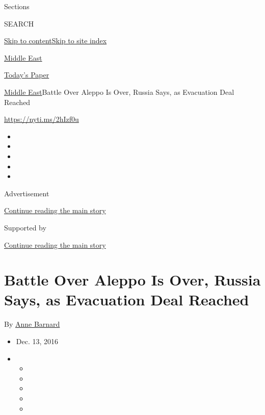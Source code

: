 Sections

SEARCH

\protect\hyperlink{site-content}{Skip to
content}\protect\hyperlink{site-index}{Skip to site index}

\href{https://www.nytimes3xbfgragh.onion/section/world/middleeast}{Middle
East}

\href{https://myaccount.nytimes3xbfgragh.onion/auth/login?response_type=cookie\&client_id=vi}{}

\href{https://www.nytimes3xbfgragh.onion/section/todayspaper}{Today's
Paper}

\href{/section/world/middleeast}{Middle East}\textbar{}Battle Over
Aleppo Is Over, Russia Says, as Evacuation Deal Reached

\url{https://nyti.ms/2hIzf0u}

\begin{itemize}
\item
\item
\item
\item
\item
\end{itemize}

Advertisement

\protect\hyperlink{after-top}{Continue reading the main story}

Supported by

\protect\hyperlink{after-sponsor}{Continue reading the main story}

\hypertarget{battle-over-aleppo-is-over-russia-says-as-evacuation-deal-reached}{%
\section{Battle Over Aleppo Is Over, Russia Says, as Evacuation Deal
Reached}\label{battle-over-aleppo-is-over-russia-says-as-evacuation-deal-reached}}

By \href{http://www.nytimes3xbfgragh.onion/by/anne-barnard}{Anne
Barnard}

\begin{itemize}
\item
  Dec. 13, 2016
\item
  \begin{itemize}
  \item
  \item
  \item
  \item
  \item
  \end{itemize}
\end{itemize}

